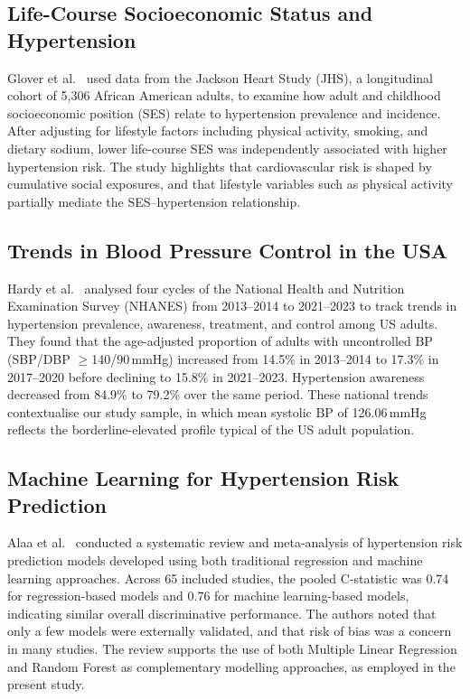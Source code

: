 ﻿\documentclass[conference]{IEEEtran}
\begin{document}
\subsection{Life-Course Socioeconomic Status and Hypertension}

Glover et al.\ \cite{hpz133} used data from the Jackson Heart Study (JHS), a
longitudinal cohort of 5{,}306 African American adults, to examine how adult and
childhood socioeconomic position (SES) relate to hypertension prevalence and
incidence. After adjusting for lifestyle factors including physical activity,
smoking, and dietary sodium, lower life-course SES was independently associated
with higher hypertension risk. The study highlights that cardiovascular risk is
shaped by cumulative social exposures, and that lifestyle variables such as
physical activity partially mediate the SES--hypertension relationship.

\subsection{Trends in Blood Pressure Control in the USA}

Hardy et al.\ \cite{hpae141} analysed four cycles of the National Health and
Nutrition Examination Survey (NHANES) from 2013--2014 to 2021--2023 to track
trends in hypertension prevalence, awareness, treatment, and control among US
adults. They found that the age-adjusted proportion of adults with uncontrolled
BP (SBP/DBP $\geq$140/90\,mmHg) increased from 14.5\% in 2013--2014 to 17.3\%
in 2017--2020 before declining to 15.8\% in 2021--2023. Hypertension awareness
decreased from 84.9\% to 79.2\% over the same period. These national trends
contextualise our study sample, in which mean systolic BP of 126.06\,mmHg
reflects the borderline-elevated profile typical of the US adult population.

\subsection{Machine Learning for Hypertension Risk Prediction}

Alaa et al.\ \cite{plosone2022} conducted a systematic review and meta-analysis
of hypertension risk prediction models developed using both traditional regression
and machine learning approaches. Across 65 included studies, the pooled
C-statistic was 0.74 for regression-based models and 0.76 for machine
learning-based models, indicating similar overall discriminative performance.
The authors noted that only a few models were externally validated, and that risk
of bias was a concern in many studies. The review supports the use of both
Multiple Linear Regression and Random Forest as complementary modelling
approaches, as employed in the present study.
\end{document}
